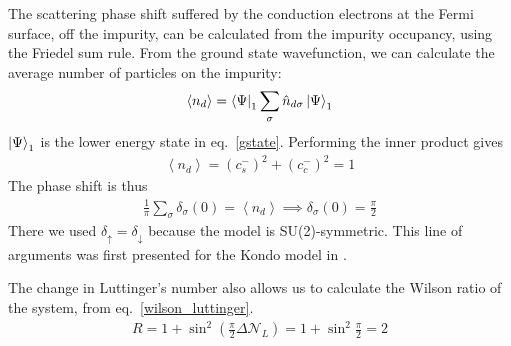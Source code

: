 The scattering phase shift suffered by the conduction electrons at the Fermi surface, off the impurity, can be calculated from the impurity occupancy, using the Friedel sum rule. From the ground state wavefunction, we can calculate the average number of particles on the impurity:
\begin{equation}\begin{aligned}
	\left<n_d \right> = \bra{\Psi}_1\sum_\sigma \hat n_{d\sigma} \ket{\Psi}_1
\end{aligned}\end{equation}
\(\ket{\Psi}_1\) is the lower energy state in eq.~\eqref{gstate}. Performing the inner product gives
\begin{equation}\begin{aligned}
	\left<n_d \right> = \left( c_s^- \right)^2 + \left( c_c^- \right)^2 = 1
\end{aligned}\end{equation}
The phase shift is thus
\begin{equation}\begin{aligned}
	\frac{1}{\pi}\sum_\sigma \delta_\sigma(0) = \left<n_d \right> \implies \delta_\sigma(0) = \frac{\pi}{2}
\end{aligned}\end{equation}
There we used \(\delta_\uparrow = \delta_\downarrow\) because the model is SU(2)-symmetric. This line of arguments was first presented for the Kondo model in \cite{martin1982fermi}.

The change in Luttinger's number also allows us to calculate the Wilson ratio of the system, from eq.~\eqref{wilson_luttinger}.
\begin{equation}\begin{aligned}
	R = 1 + \sin^2 \left( \frac{\pi}{2}\Delta \mathcal{N}_L \right) = 1 + \sin^2 \frac{\pi}{2} = 2
\end{aligned}\end{equation}
